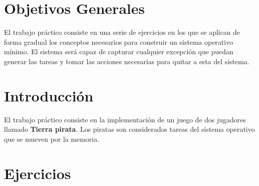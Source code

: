 \documentclass[a4paper,10pt]{article}
\begin{document}
\thispagestyle{empty}

\maketitle
\newpage

\section{Objetivos Generales}
El trabajo práctico consiste en una serie de ejercicios en los que se aplican de forma gradual los conceptos necesarios para construir un sistema operativo mínimo.
El sistema será capaz de capturar cualquier excepción que puedan generar las tareas y tomar las acciones necesarias para quitar a esta del sistema.

\section{Introducción}
El trabajo práctico consiste en la implementación de un juego de dos jugadores llamado \textbf{Tierra pirata}.
Los piratas son considerados tareas del sistema operativo que se mueven por la memoria.

\section{Ejercicios}
\end{document}
